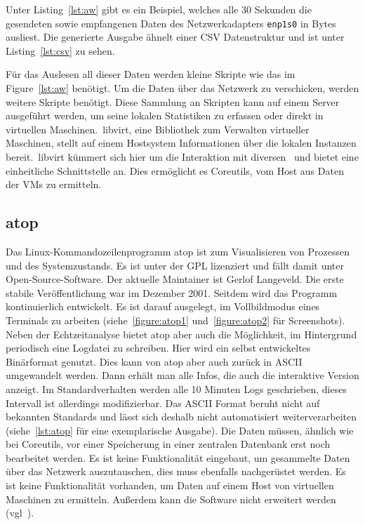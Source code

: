 Unter Listing~\ref{lst:aw} gibt es ein Beispiel, welches alle 30 Sekunden die
gesendeten sowie empfangenen Daten des Netzwerkadapters \texttt{enp1s0} in
Bytes ausliest. Die generierte Ausgabe ähnelt einer \gls{CSV} Datenstruktur und
ist unter Listing~\ref{lst:csv} zu sehen.

Für das Auslesen all dieser Daten werden kleine Skripte wie das im
Figure~\ref{lst:aw} benötigt. Um die Daten über das Netzwerk zu verschicken,
werden weitere Skripte benötigt. Diese Sammlung an Skripten kann auf einem
Server ausgeführt werden, um seine lokalen Statistiken zu erfassen oder direkt
in virtuellen Maschinen.\ libvirt, eine Bibliothek zum Verwalten virtueller
Maschinen, stellt auf einem Hostsystem Informationen über die lokalen Instanzen
bereit.\ libvirt kümmert sich hier um die Interaktion mit
diversen~ und bietet eine einheitliche
Schnittstelle an. Dies ermöglicht es Coreutils, vom Host aus Daten der VMs zu
ermitteln.
\tm%

\subsection{atop}
Das Linux\hyp{}Kommandozeilenprogramm atop ist zum Visualisieren von Prozessen
und des Systemzustands. Es ist unter der GPL lizenziert und fällt damit unter
Open\hyp{}Source\hyp{}Software. Der aktuelle \gls{Maintainer} ist Gerlof
Langeveld. Die erste stabile Veröffentlichung war im Dezember 2001. Seitdem
wird das Programm kontinuierlich entwickelt. Es ist darauf ausgelegt, im
Vollbildmodus eines Terminals zu arbeiten (siehe~\ref{figure:atop1}
und~\ref{figure:atop2} für Screenshots). Neben der Echtzeitanalyse bietet atop
aber auch die Möglichkeit, im Hintergrund periodisch eine Logdatei zu
schreiben. Hier wird ein selbst entwickeltes Binärformat genutzt. Dies kann von
atop aber auch zurück in ASCII umgewandelt werden. Dann erhält man alle Infos,
die auch die interaktive Version anzeigt. Im Standardverhalten werden alle 10
Minuten Logs geschrieben, dieses Intervall ist allerdings modifizierbar. Das
ASCII Format beruht nicht auf bekannten Standards und lässt sich deshalb nicht
automatisiert weiterverarbeiten (siehe~\ref{lst:atop} für eine exemplarische
Ausgabe). Die Daten müssen, ähnlich wie bei Coreutils, vor einer Speicherung in
einer zentralen Datenbank erst noch bearbeitet werden. Es ist keine
Funktionalität eingebaut, um gesammelte Daten über das Netzwerk auszutauschen,
dies muss ebenfalls nachgerüstet werden. Es ist keine Funktionalität vorhanden,
um Daten auf einem Host von virtuellen Maschinen zu ermitteln. Außerdem kann
die Software nicht erweitert werden (vgl~\cite{atop}).
\tm%

